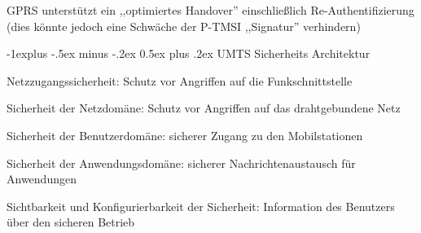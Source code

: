 \documentclass[a4paper]{article}
\makeatletter
\renewcommand{\subsection}{\@startsection{subsection}{2}{0mm}%
 {-1explus -.5ex minus -.2ex}%
 {0.5ex plus .2ex}%
 {\normalfont\normalsize\bfseries}}
\makeatother
\begin{document}
\begin{multicols}{3}
      \begin{itemize*}
            \item GPRS unterstützt ein ,,optimiertes Handover'' einschließlich
            Re-Authentifizierung (dies könnte jedoch eine Schwäche der P-TMSI
            ,,Signatur'' verhindern)
      \end{itemize*}


      \subsection{UMTS Sicherheits Architektur}

      \begin{enumerate*}
            \def\labelenumi{\arabic{enumi}.}
            \item Netzzugangssicherheit: Schutz vor Angriffen auf die Funkschnittstelle
            \item Sicherheit der Netzdomäne: Schutz vor Angriffen auf das drahtgebundene
            Netz
            \item Sicherheit der Benutzerdomäne: sicherer Zugang zu den Mobilstationen
            \item Sicherheit der Anwendungsdomäne: sicherer Nachrichtenaustausch für
            Anwendungen
            \item Sichtbarkeit und Konfigurierbarkeit der Sicherheit: Information des
            Benutzers über den sicheren Betrieb
      \end{enumerate*}


\end{multicols}
\end{document}
